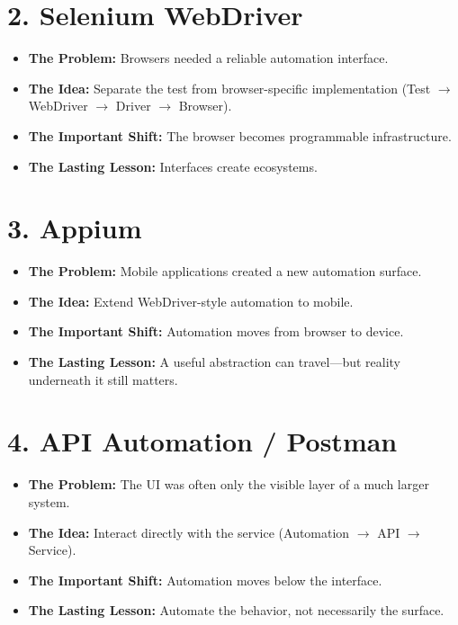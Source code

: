 \documentclass[11pt,twoside]{book}
\begin{document}
\section*{2. Selenium WebDriver}
\begin{itemize}[nosep]
    \item \textbf{The Problem:} Browsers needed a reliable automation interface.
    \item \textbf{The Idea:} Separate the test from browser-specific implementation (Test $\rightarrow$ WebDriver $\rightarrow$ Driver $\rightarrow$ Browser).
    \item \textbf{The Important Shift:} The browser becomes programmable infrastructure.
    \item \textbf{The Lasting Lesson:} Interfaces create ecosystems.
\end{itemize}

\section*{3. Appium}
\begin{itemize}[nosep]
    \item \textbf{The Problem:} Mobile applications created a new automation surface.
    \item \textbf{The Idea:} Extend WebDriver-style automation to mobile.
    \item \textbf{The Important Shift:} Automation moves from browser to device.
    \item \textbf{The Lasting Lesson:} A useful abstraction can travel---but reality underneath it still matters.
\end{itemize}

\section*{4. API Automation / Postman}
\begin{itemize}[nosep]
    \item \textbf{The Problem:} The UI was often only the visible layer of a much larger system.
    \item \textbf{The Idea:} Interact directly with the service (Automation $\rightarrow$ API $\rightarrow$ Service).
    \item \textbf{The Important Shift:} Automation moves below the interface.
    \item \textbf{The Lasting Lesson:} Automate the behavior, not necessarily the surface.
\end{itemize}
\end{document}
